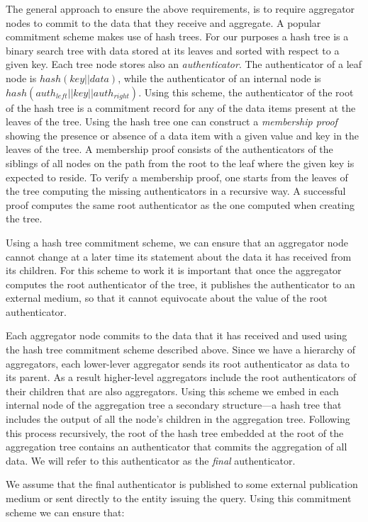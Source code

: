 \documentclass{article}
\begin{document}
The general approach to ensure the above requirements, is to require
aggregator nodes to commit to the data that they receive and
aggregate. A popular commitment scheme makes use of hash trees. For
our purposes a hash tree is a binary search tree with data stored at
its leaves and sorted with respect to a given key. Each tree node
stores also an \emph{authenticator}. The authenticator of a leaf node
is $hash(key||data)$, while the authenticator of an internal node is
$hash(auth_{left}||key||auth_{right})$. Using this scheme, the
authenticator of the root of the hash tree is a commitment record for
any of the data items present at the leaves of the tree. Using the
hash tree one can construct a \emph{membership proof} showing the
presence or absence of a data item with a given value and key in the
leaves of the tree. A membership proof consists of the authenticators
of the siblings of all nodes on the path from the root to the leaf
where the given key is expected to reside. To verify a membership
proof, one starts from the leaves of the tree computing the missing
authenticators in a recursive way. A successful proof computes the
same root authenticator as the one computed when creating the tree.


Using a hash tree commitment scheme, we can ensure that an aggregator
node cannot change at a later time its statement about the data it has
received from its children. For this scheme to work it is important
that once the aggregator computes the root authenticator of the tree,
it publishes the authenticator to an external medium, so that it
cannot equivocate about the value of the root authenticator.

Each aggregator node commits to the data that it has received and used
using the hash tree commitment scheme described above. Since we have a
hierarchy of aggregators, each lower-lever aggregator sends its root
authenticator as data to its parent. As a result higher-level
aggregators include the root authenticators of their children that are
also aggregators. Using this scheme we embed in each internal node of
the aggregation tree a secondary structure---a hash tree that includes
the output of all the node's children in the aggregation tree. Following this
process recursively, the root of the hash tree embedded at the root of
the aggregation tree contains an authenticator that commits the
aggregation of all data. We will refer to this authenticator as the
\emph{final} authenticator.

We assume that the final authenticator is published to some external
publication medium or sent directly to the entity issuing the
query. Using this commitment scheme we can ensure that:
\end{document}
